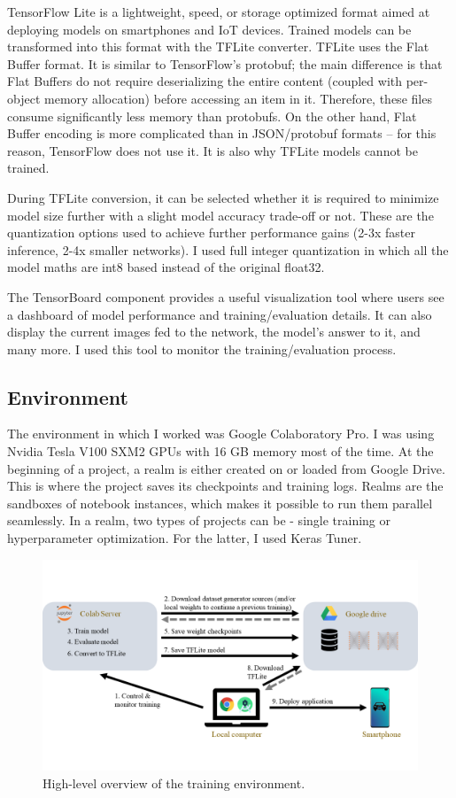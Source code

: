 TensorFlow Lite is a lightweight, speed, or storage optimized format aimed at deploying models on smartphones and IoT devices. Trained models can be transformed into this format with the TFLite converter. TFLite uses the Flat Buffer\cite{Flatbuf} format. It is similar to TensorFlow’s protobuf; the main difference is that Flat Buffers do not require deserializing the entire content (coupled with per-object memory allocation) before accessing an item in it. Therefore, these files consume significantly less memory than protobufs. On the other hand, Flat Buffer encoding is more complicated than in JSON/protobuf formats – for this reason, TensorFlow does not use it. It is also why TFLite models cannot be trained.

During TFLite conversion, it can be selected whether it is required to minimize model size further with a slight model accuracy trade-off or not. These are the quantization\cite{TensorFlowQuant} options used to achieve further performance gains (2-3x faster inference, 2-4x smaller networks). I used full integer quantization in which all the model maths are int8 based instead of the original float32.

The TensorBoard component provides a useful visualization tool where users see a dashboard of model performance and training/evaluation details. It can also display the current images fed to the network, the model’s answer to it, and many more. I used this tool to monitor the training/evaluation process.

\subsection{Environment}

The environment in which I worked was Google Colaboratory Pro. I was using Nvidia Tesla V100 SXM2 GPUs with 16 GB memory most of the time. At the beginning of a project, a realm is either created on or loaded from Google Drive. This is where the project saves its checkpoints and training logs. Realms are the sandboxes of notebook instances, which makes it possible to run them parallel seamlessly. In a realm, two types of projects can be - single training or hyperparameter optimization. For the latter, I used Keras Tuner.

\begin{figure}[htb]
 \centerline{\includegraphics[width=.85\columnwidth]{.//Figure/Technologies/Slide1.PNG}}
 \caption{High-level overview of the training environment.}
 \label{fig:simple}
\end{figure}

